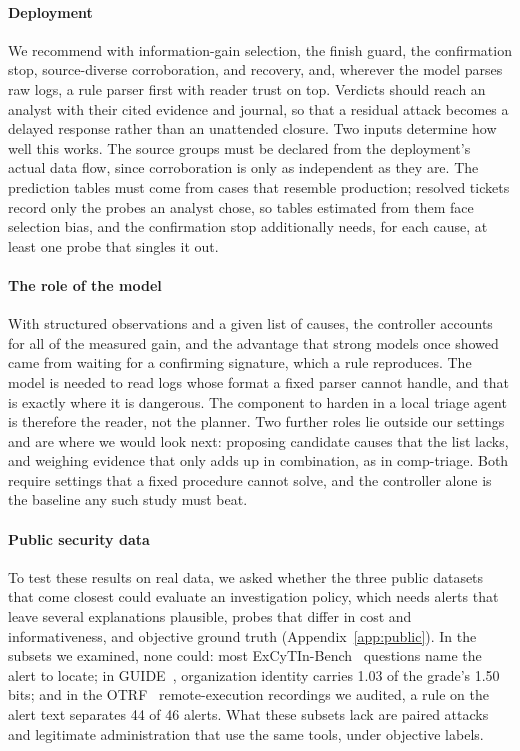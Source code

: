 \paragraph{Deployment} We recommend \hesp{} with information-gain selection, the finish guard, the confirmation stop, source-diverse corroboration, and recovery, and, wherever the model parses raw logs, a rule parser first with reader trust on top. Verdicts should reach an analyst with their cited evidence and journal, so that a residual attack becomes a delayed response rather than an unattended closure. Two inputs determine how well this works. The source groups must be declared from the deployment's actual data flow, since corroboration is only as independent as they are. The prediction tables must come from cases that resemble production; resolved tickets record only the probes an analyst chose, so tables estimated from them face selection bias, and the confirmation stop additionally needs, for each cause, at least one probe that singles it out.

\paragraph{The role of the model} With structured observations and a given list of causes, the controller accounts for all of the measured gain, and the advantage that strong models once showed came from waiting for a confirming signature, which a rule reproduces. The model is needed to read logs whose format a fixed parser cannot handle, and that is exactly where it is dangerous. The component to harden in a local triage agent is therefore the reader, not the planner. Two further roles lie outside our settings and are where we would look next: proposing candidate causes that the list lacks, and weighing evidence that only adds up in combination, as in comp-triage. Both require settings that a fixed procedure cannot solve, and the controller alone is the baseline any such study must beat.

\paragraph{Public security data}\label{sec:realdata} To test these results on real data, we asked whether the three public datasets that come closest could evaluate an investigation policy, which needs alerts that leave several explanations plausible, probes that differ in cost and informativeness, and objective ground truth (Appendix~\ref{app:public}). In the subsets we examined, none could: most ExCyTIn-Bench~\citep{excytin} questions name the alert to locate; in GUIDE~\citep{guide}, organization identity carries 1.03 of the grade's 1.50 bits; and in the OTRF~\citep{otrf} remote-execution recordings we audited, a rule on the alert text separates 44 of 46 alerts. What these subsets lack are paired attacks and legitimate administration that use the same tools, under objective labels.
